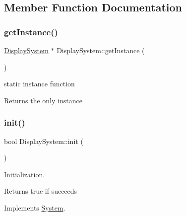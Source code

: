 \subsection{Member Function Documentation}
\mbox{\label{class_display_system_a0c534969353819f8f0e2fafe212734bc}} 
\subsubsection{\texorpdfstring{get\+Instance()}{getInstance()}}
{\footnotesize\ttfamily \mbox{\hyperlink{class_display_system}{Display\+System}} $\ast$ Display\+System\+::get\+Instance (\begin{DoxyParamCaption}{ }\end{DoxyParamCaption})\hspace{0.3cm}{\ttfamily [static]}}



static instance function 

\begin{DoxyReturn}{Returns}
the only instance 
\end{DoxyReturn}
\mbox{\label{class_display_system_ad1da18a99d8d2dd15ecbd1f355f306f5}} 
\subsubsection{\texorpdfstring{init()}{init()}}
{\footnotesize\ttfamily bool Display\+System\+::init (\begin{DoxyParamCaption}{ }\end{DoxyParamCaption})\hspace{0.3cm}{\ttfamily [virtual]}}



Initialization. 

\begin{DoxyReturn}{Returns}
true if succeeds 
\end{DoxyReturn}


Implements \mbox{\hyperlink{class_system_acf69544628d6c807ebd7dc03118711f0}{System}}.

\mbox{\label{class_display_system_a648e9597c6a629a2aab5f8ba7c3d28e8}} 
